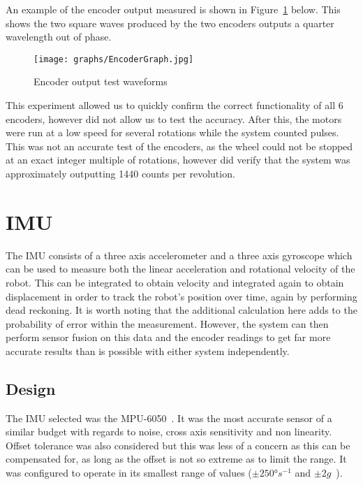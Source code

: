 An example of the encoder output measured is shown in Figure~\ref{EncoderGraph} below. This shows the two square waves produced by the
two encoders outputs a quarter wavelength out of phase.

\begin{figure}[!ht]
	\centering
	\texttt{[image: graphs/EncoderGraph.jpg]}
	\caption{Encoder output test waveforms}\label{EncoderGraph}

\end{figure}

This experiment allowed us to quickly confirm the correct functionality
of all 6 encoders, however did not allow us to test the accuracy. After
this, the motors were run at a low speed for several rotations while the
system counted pulses. This was not an accurate test of the encoders, as
the wheel could not be stopped at an exact integer multiple of rotations,
however did verify that the system was approximately outputting 1440
counts per revolution.

\section{IMU}\label{elec/imu}
The IMU consists of a three axis accelerometer and a three axis gyroscope
which can be used to measure both the linear acceleration and rotational
velocity of the robot. This can be integrated to obtain velocity and integrated again
to obtain displacement in order to track the robot's position over time, again by performing dead reckoning. It is worth noting
that the additional calculation here adds to the probability of error within the measurement. However, the
system can then perform sensor fusion on this data and the encoder
readings to get far more accurate results than is possible with either system
independently.

\subsection{Design}\label{elec/imu/design}
The IMU selected was the MPU-6050~\cite{MPU6050Datasheet}. It was the most accurate sensor of a
similar budget with regards to noise, cross axis sensitivity and non
linearity. Offset tolerance was also considered but this was less of a
concern as this can be compensated for, as long as the offset is not
so extreme as to limit the range. It was configured to operate in its
smallest range of values ($\pm\ang{250}s^{-1}$ and $\pm2g$~\cite{MPU6050Datasheet}).

